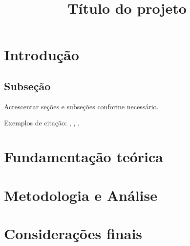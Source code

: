 \documentclass[a4paper,11pt]{article}
\title{Título do projeto} %
\begin{document}
\maketitle

\author{ %
}

\vspace{8mm}





\section{Introdução}
 
\subsection{Subseção}

Acrescentar seções e subseções conforme necessário.

Exemplos de citação: \cite{web:16}, \citet{anna:06}, \citeauthor{pele:04}.

\section{Fundamentação teórica}

\section{Metodologia e Análise}

\section{Considerações finais}


\end{document}
